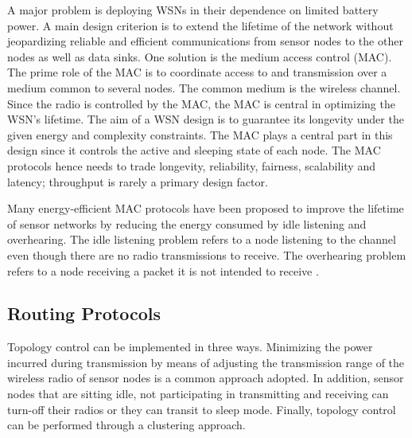 A major problem is deploying WSNs in their dependence on limited battery power. A main design criterion is to extend the lifetime of the network without jeopardizing reliable and efficient communications from sensor nodes to the other nodes as well as data sinks. One solution is the medium access control (MAC). The prime role of the MAC is to coordinate access to and transmission over a medium common to several nodes. The common medium is the wireless channel. Since the radio is controlled by the MAC, the MAC is central in optimizing the WSN's lifetime. The aim of a WSN design is to guarantee its longevity under the given energy and complexity constraints. The MAC plays a central part in this design since it controls the active and sleeping state of each node. The MAC protocols hence needs to trade longevity, reliability, fairness, scalability and latency; throughput is rarely a primary design factor. \cite{macsurvey}

Many energy-efficient MAC protocols have been proposed to improve the lifetime of sensor networks by reducing the energy consumed by idle listening and overhearing. The idle listening problem refers to a node listening to the channel even though there are no radio transmissions to receive. The overhearing problem refers to a node receiving a packet it is not intended to receive \cite{pwmac}. 

\subsection{Routing Protocols}
Topology control can be implemented in three ways. Minimizing the power incurred during transmission by means of adjusting the transmission range of the wireless radio of sensor nodes is a common approach adopted. In addition, sensor nodes that are sitting idle, not participating in transmitting and receiving can turn-off their radios or they can transit to sleep mode. Finally, topology control can be performed through a clustering approach. \cite{azrinasurvey}

